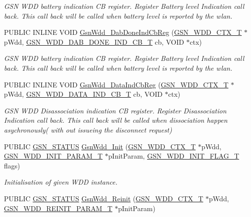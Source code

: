 \begin{DoxyCompactItemize}
\begin{DoxyCompactList}\small\item\em GSN WDD battery indication CB register. Register Battery level Indication call back. This call back will be called when battery level is reported by the wlan. \end{DoxyCompactList}\item 
PUBLIC INLINE VOID \hyperlink{a00677_ga689c811b864189de9e85558136b7587d}{GsnWdd\_\-DabDoneIndCbReg} (\hyperlink{a00108}{GSN\_\-WDD\_\-CTX\_\-T} $\ast$pWdd, \hyperlink{a00677_ga609ae39dc432b9821b764bea4957369a}{GSN\_\-WDD\_\-DAB\_\-DONE\_\-IND\_\-CB\_\-T} cb, VOID $\ast$ctx)
\begin{DoxyCompactList}\small\item\em GSN WDD battery indication CB register. Register Battery level Indication call back. This call back will be called when battery level is reported by the wlan. \end{DoxyCompactList}\item 
PUBLIC INLINE VOID \hyperlink{a00677_gafb4865d7da2c56855e31130d2d3b5f31}{GsnWdd\_\-DataIndCbReg} (\hyperlink{a00108}{GSN\_\-WDD\_\-CTX\_\-T} $\ast$pWdd, \hyperlink{a00603_a6ba5be1c4251a77b2a642319af4b696b}{GSN\_\-WDD\_\-DATA\_\-IND\_\-CB\_\-T} cb, VOID $\ast$ctx)
\begin{DoxyCompactList}\small\item\em GSN WDD Disassociation indication CB register. Register Disassociation Indication call back. This call back will be called when dissociation happen asychronously( with out issueing the disconnect request) \end{DoxyCompactList}\item 
PUBLIC \hyperlink{a00660_gada5951904ac6110b1fa95e51a9ddc217}{GSN\_\-STATUS} \hyperlink{a00677_ga531570f995c4706e4dfc0a3b19ddc634}{GsnWdd\_\-Init} (\hyperlink{a00108}{GSN\_\-WDD\_\-CTX\_\-T} $\ast$pWdd, \hyperlink{a00276}{GSN\_\-WDD\_\-INIT\_\-PARAM\_\-T} $\ast$pInitParam, \hyperlink{a00603_ae0e55b26e7cfed5cc849b360e24289e3}{GSN\_\-WDD\_\-INIT\_\-FLAG\_\-T} flags)
\begin{DoxyCompactList}\small\item\em Initialisation of given WDD instance. \end{DoxyCompactList}\item 
PUBLIC \hyperlink{a00660_gada5951904ac6110b1fa95e51a9ddc217}{GSN\_\-STATUS} \hyperlink{a00603_a4ca55fe62f39d3212f56cd4ccd1b1c70}{GsnWdd\_\-Reinit} (\hyperlink{a00108}{GSN\_\-WDD\_\-CTX\_\-T} $\ast$pWdd, \hyperlink{a00284}{GSN\_\-WDD\_\-REINIT\_\-PARAM\_\-T} $\ast$pInitParam)

\end{DoxyCompactItemize}
